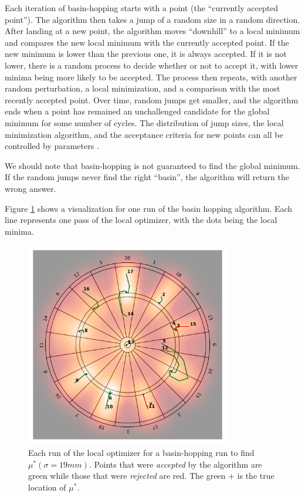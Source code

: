 \documentclass[]{article}
\newcommand{\mustar}{\ensuremath{\mu^* }}
\begin{document}
Each iteration of basin-hopping starts with a point (the ``currently accepted point''). The algorithm then takes a jump of a random size in a random direction. After landing at  a new point, the algorithm  moves ``downhill'' to a local minimum and compares the new local minimum with the currently accepted point. If the new minimum is lower than the previous one, it is always accepted. If it is not lower, there is a random process to decide whether or not to accept it, with lower minima being more likely to be accepted. The process then repeats, with another random perturbation, a local minimization, and a comparison with the most recently accepted point. Over time, random jumps get smaller, and the algorithm ends when a point has remained an unchallenged candidate for the global minimum for some number of cycles. The distribution of jump sizes, the local minimization algorithm, and the acceptance criteria for new points can all be controlled by parameters \cite{basin}.

We should note that basin-hopping is not guaranteed to find the global minimum. If the random jumps never find the right ``basin'', the algorithm will return the wrong answer. 

Figure \ref{fig:basin} shows a visualization for one run of the basin hopping algorithm. Each line represents one pass of the local optimizer, with the dots being the local minima. 

\begin{figure}
	\centering
	\includegraphics[width=0.8\textwidth]{../images/sig19basin.png}
	\caption{Each run of the local optimizer for a basin-hopping run to find $\mustar(\sigma=19mm)$.  Points that were \textit{accepted} by the algorithm are green while those that were \textit{rejected} are red. The green + is the true location of \mustar.}
	\label{fig:basin}
\end{figure}
\end{document}
